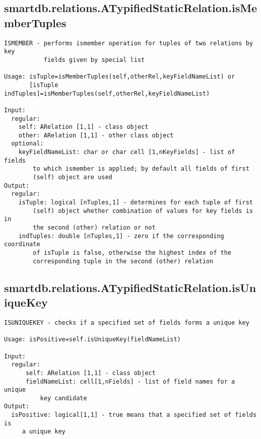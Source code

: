 \subsection{\texorpdfstring{smartdb.relations.ATypifiedStaticRelation.isMemberTuples}{isMemberTuples}}\label{method:smartdb.relations.ATypifiedStaticRelation.isMemberTuples}
\begin{verbatim}
ISMEMBER - performs ismember operation for tuples of two relations by key
           fields given by special list

Usage: isTuple=isMemberTuples(self,otherRel,keyFieldNameList) or
       [isTuple indTuples]=isMemberTuples(self,otherRel,keyFieldNameList)

Input:
  regular:
    self: ARelation [1,1] - class object
    other: ARelation [1,1] - other class object
  optional:
    keyFieldNameList: char or char cell [1,nKeyFields] - list of fields
        to which ismember is applied; by default all fields of first
        (self) object are used
Output:
  regular:
    isTuple: logical [nTuples,1] - determines for each tuple of first
        (self) object whether combination of values for key fields is in
        the second (other) relation or not
    indTuples: double [nTuples,1] - zero if the corresponding coordinate
        of isTuple is false, otherwise the highest index of the
        corresponding tuple in the second (other) relation
\end{verbatim}
\subsection{\texorpdfstring{smartdb.relations.ATypifiedStaticRelation.isUniqueKey}{isUniqueKey}}\label{method:smartdb.relations.ATypifiedStaticRelation.isUniqueKey}
\begin{verbatim}
ISUNIQUEKEY - checks if a specified set of fields forms a unique key

Usage: isPositive=self.isUniqueKey(fieldNameList)

Input:
  regular:
      self: ARelation [1,1] - class object
      fieldNameList: cell[1,nFields] - list of field names for a unique
          key candidate
Output:
  isPositive: logical[1,1] - true means that a specified set of fields is
     a unique key
\end{verbatim}
